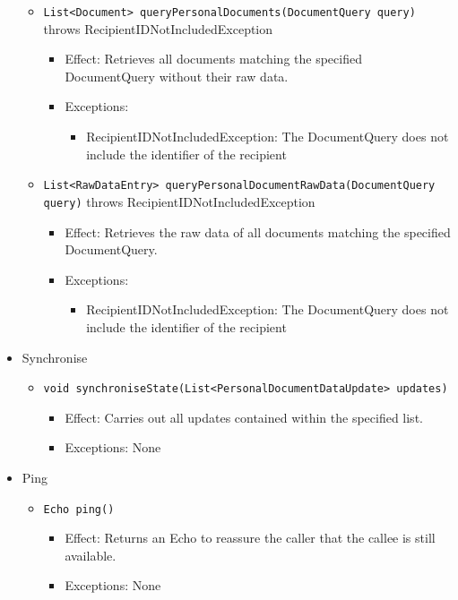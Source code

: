 \documentclass[a4paper,10pt]{article}
\begin{document}
\begin{itemize}
\begin{itemize}
		\item \texttt{List<Document> queryPersonalDocuments(DocumentQuery query)} throws RecipientIDNotIncludedException
		\begin{itemize}
			\item Effect: Retrieves all documents matching the specified DocumentQuery without their raw data.
			\item Exceptions:
			\begin{itemize}
				\item RecipientIDNotIncludedException: The DocumentQuery does not include the identifier of the recipient
			\end{itemize}
		\end{itemize}

		\item \texttt{List<RawDataEntry> queryPersonalDocumentRawData(DocumentQuery query)} throws RecipientIDNotIncludedException
		\begin{itemize}
			\item Effect: Retrieves the raw data of all documents matching the specified DocumentQuery.
			\item Exceptions:
			\begin{itemize}
				\item RecipientIDNotIncludedException: The DocumentQuery does not include the identifier of the recipient
			\end{itemize}
		\end{itemize}
	\end{itemize}

	\item Synchronise
	\begin{itemize}
		\item \texttt{void synchroniseState(List<PersonalDocumentDataUpdate> updates)}
		\begin{itemize}
			\item Effect: Carries out all updates contained within the specified list.
			\item Exceptions: None
		\end{itemize}
	\end{itemize}

	\item Ping
	\begin{itemize}
		\item \texttt{Echo ping()}
		\begin{itemize}
			\item Effect: Returns an Echo to reassure the caller that the callee is still available.
			\item Exceptions: None
		\end{itemize}
	\end{itemize}
\end{itemize}
\end{document}

